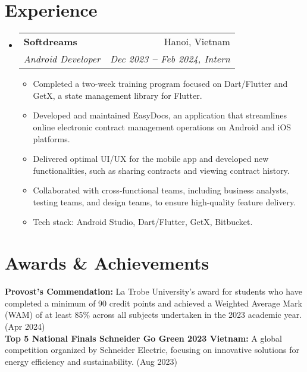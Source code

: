 \documentclass[letterpaper,11pt]{article}
\makeatletter
\newcommand{\resumeItem}[1]{
  \item\small{
    {#1 \vspace{-2pt}}
  }
}
\newcommand{\resumeSubheading}[4]{
  \vspace{-2pt}\item
    \begin{tabular*}{0.97\textwidth}[t]{l@{\extracolsep{\fill}}r}
      \textbf{#1} & #2 \\
      \textit{\small#3} & \textit{\small #4} \\
    \end{tabular*}\vspace{-7pt}
}
\newcommand{\resumeSubHeadingListStart}{\begin{itemize}[leftmargin=0.15in, label={}]}
\newcommand{\resumeSubHeadingListEnd}{\end{itemize}}
\newcommand{\resumeItemListStart}{\begin{itemize}}
\newcommand{\resumeItemListEnd}{\end{itemize}\vspace{-5pt}}
\makeatother
\begin{document}

\section{Experience}
\vspace{3pt}
\resumeSubHeadingListStart

\resumeSubheading
{Softdreams}{Hanoi, Vietnam}
{Android Developer}{Dec 2023 \textbf{--} Feb 2024, Intern}
\resumeItemListStart
\resumeItem{Completed a two-week training program focused on Dart/Flutter and GetX, a state management library for Flutter.}
\resumeItem{Developed and maintained EasyDocs, an application that streamlines online electronic contract management operations on Android and iOS platforms.}
\resumeItem{Delivered optimal UI/UX for the mobile app and developed new functionalities, such as sharing contracts and viewing contract history.}
\resumeItem{Collaborated with cross-functional teams, including business analysts, testing teams, and design teams, to ensure high-quality feature delivery.}
\resumeItem{Tech stack: Android Studio, Dart/Flutter, GetX, Bitbucket.}
\resumeItemListEnd

\resumeSubHeadingListEnd




\section{Awards \& Achievements}
\vspace{2pt}
\resumeSubHeadingListStart
\small{\item{
	            \textbf{Provost’s Commendation:}{ La Trobe University's award for students who have completed a minimum of 90 credit points and achieved a Weighted Average Mark (WAM) of at least 85\% across all subjects undertaken in the 2023 academic year. (Apr 2024)} \\ \vspace{3pt}
	            \textbf{Top 5 National Finals Schneider Go Green 2023 Vietnam:}{ A global competition organized by Schneider Electric, focusing on innovative solutions for energy efficiency and sustainability. (Aug 2023)} \\ \vspace{3pt}
	      }}
\resumeSubHeadingListEnd



\end{document}
